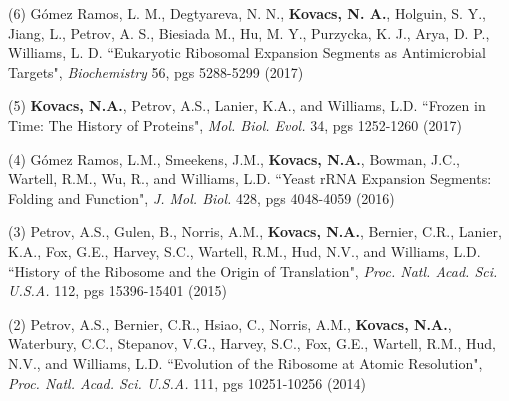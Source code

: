

\begin{cvpublications}


\cvpublication
{(6) G{\'o}mez Ramos, L. M., Degtyareva, N. N., {\bf Kovacs, N. A.}, Holguin, S. Y., Jiang, L., Petrov, A. S., Biesiada M., Hu, M. Y., Purzycka, K. J., Arya, D. P., Williams, L. D. ``Eukaryotic Ribosomal Expansion Segments as Antimicrobial Targets", \textit{Biochemistry} 56, pgs 5288-5299 (2017) }
\vspace{-4.0mm}


\cvpublication
{(5) {\bf Kovacs, N.A.}, Petrov, A.S., Lanier, K.A., and Williams, L.D. ``Frozen in Time: The History of Proteins", \textit{Mol. Biol. Evol.} 34, pgs 1252-1260 (2017)}
\vspace{-4.0mm}


\cvpublication
{(4) G{\'o}mez Ramos, L.M., Smeekens, J.M., {\bf Kovacs, N.A.}, Bowman, J.C., Wartell, R.M., Wu, R., and Williams, L.D. ``Yeast rRNA Expansion Segments: Folding and Function", \textit{J. Mol. Biol.} 428, pgs 4048-4059 (2016)}
\vspace{-4.0mm}


\cvpublication
{(3) Petrov, A.S., Gulen, B., Norris, A.M., {\bf Kovacs, N.A.}, Bernier, C.R., Lanier, K.A., Fox, G.E., Harvey, S.C., Wartell, R.M., Hud, N.V., and Williams, L.D. ``History of the Ribosome and the Origin of Translation", \textit{Proc. Natl. Acad. Sci. U.S.A.} 112, pgs 15396-15401 (2015)}
\vspace{-4.0mm}


\cvpublication
{(2) Petrov, A.S., Bernier, C.R., Hsiao, C., Norris, A.M., {\bf Kovacs, N.A.}, Waterbury, C.C., Stepanov, V.G., Harvey, S.C., Fox, G.E., Wartell, R.M., Hud, N.V., and Williams, L.D. ``Evolution of the Ribosome at Atomic Resolution", \textit{Proc. Natl. Acad. Sci. U.S.A.} 111, pgs 10251-10256 (2014)}
\vspace{-4.0mm}


\end{cvpublications}
